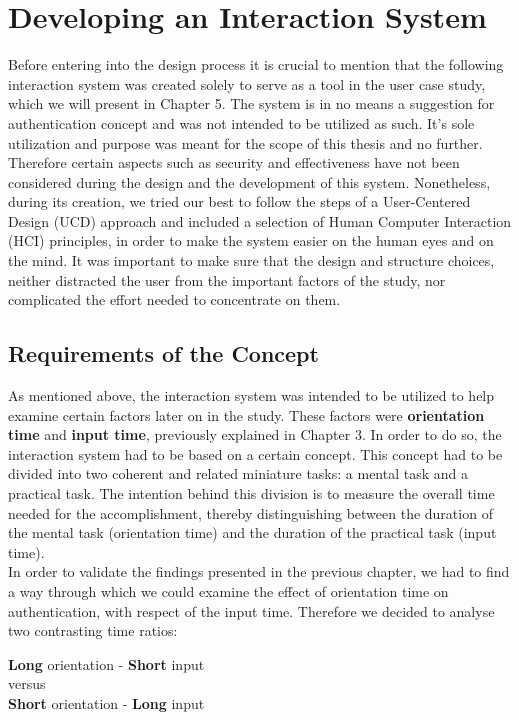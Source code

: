 
\chapter{Developing an Interaction System}\label{ch:forth}


Before entering into the design process it is crucial to mention that the following interaction system was created solely to serve as a tool in the user case study, which we will present in Chapter 5. The system is in no means a suggestion for authentication concept and was not intended to be utilized as such. It's sole utilization and purpose was meant for the scope of this thesis and no further. Therefore certain aspects such as security and effectiveness have not been considered during the design and the development of this system. Nonetheless, during its creation, we tried our best to follow the steps of a User-Centered Design (UCD) approach and included a selection of Human Computer Interaction (HCI) principles, in order to make the system easier on the human eyes and on the mind. It was important to make sure that the design and structure choices, neither distracted the user from the important factors of the study, nor complicated the effort needed to concentrate on them.  

\section{Requirements of the Concept}
As mentioned above, the interaction system was intended to be utilized to help examine certain factors later on in the study. These factors were \textbf{orientation time} and \textbf{input time}, previously explained in Chapter 3. In order to do so, the interaction system had to be based on a certain concept. This concept had to be divided into two coherent and related miniature tasks: a mental task and a practical task. The intention behind this division is to measure the overall time needed for the accomplishment, thereby distinguishing between the duration of the mental task (orientation time) and the duration of the practical task (input time). \\

In order to validate the findings presented in the previous chapter, we had to find a way through which we could examine the effect of orientation time on authentication, with respect of the input time. Therefore we decided to analyse two contrasting time ratios: 
\begin{center}
    \textbf{Long} orientation - \textbf{Short} input \\
    versus \\
    \textbf{Short} orientation - \textbf{Long} input
\end{center} 


